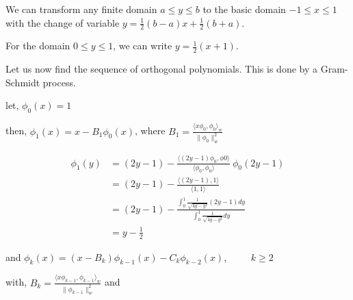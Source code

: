 \documentclass[a4paper,11pt]{report}
\begin{document}
\begin{enumerate}
\begin{itemize}
    We can transform any finite domain $a \le y \le b$ to the basic domain $-1 \le x \le 1$ with the change of variable
    $y = \displaystyle \frac{1}{2} (b - a)x + \frac{1}{2} (b + a)$.

    For the domain $0 \le y \le 1$, we can write $y = \displaystyle \frac{1}{2} (x + 1)$.
    
    Let us now find the sequence of orthogonal polynomials. This is done by a Gram-Schmidt process. 

    let, $\phi_{0}(x) = 1$

    then, $\phi_{1}(x) = x - B_{1} \phi_{0}(x)$, where $B_{1} = \displaystyle \frac{\langle x \phi_{0}, \phi_{0} \rangle_{w}}{\| \phi_{0} \|_{w}^{2}}$
    
    \begin{equation*}
    \begin{aligned}
    \phi_{1}(y) &= (2y-1) - \displaystyle \frac{\langle (2y-1) \phi_{0}, \phi{0} \rangle}{\langle \phi_{0}, \phi_{0} \rangle}\ \phi_{0}(2y-1) \\
                &= (2y-1) - \displaystyle \frac{\langle (2y-1), 1 \rangle}{\langle 1, 1 \rangle} \\
                &= (2y-1) - \displaystyle \frac{\displaystyle\int_{0}^{1} \frac{1}{\sqrt{4y-y^2}} (2y-1) dy}{\displaystyle\int_{0}^{1} \frac{1}{\sqrt{4y-y^2}} dy} \\
                &= y - \frac{1}{2}
    \end{aligned}
    \end{equation*}

    and $\phi_{k}(x) = (x - B_{k}) \phi_{k-1}(x) - C_{k} \phi_{k-2}(x), \hspace{1cm} k \ge 2$ 

    with, $B_{k} = \displaystyle \frac{\langle x \phi_{k-1}, \phi_{k-1} \rangle_{w}}{\| \phi_{k-1} \|_{w}^{2}}$ and


\end{itemize}
\end{enumerate}
\end{document}
